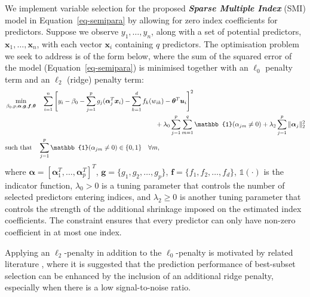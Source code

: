 \documentclass[
  11pt,
  a4paper,
]{article}
\begin{document}
We implement variable selection for the proposed \textbf{\emph{Sparse
Multiple Index}} (SMI) model in Equation~\ref{eq-semipara} by allowing
for zero index coefficients for predictors. Suppose we observe
\(y_1,\dots,y_n\), along with a set of potential predictors,
\(\bm{x}_1,\dots,\bm{x}_n\), with each vector \(\bm{x}_i\) containing
\(q\) predictors. The optimisation problem we seek to address is of the
form below, where the sum of the squared error of the model
(Equation~\ref{eq-semipara}) is minimised together with an \(\ell_{0}\)
penalty term and an \(\ell_{2}\) (ridge) penalty term: \begin{align}
  & \min_{\beta_{0}, p, \bm{\alpha}, \bm{g}, \bm{f}, \bm{\theta}} \quad \sum_{i = 1}^{n}\Bigg [ y_{i} - \beta_{0} - \sum_{j = 1}^{p}g_{j}(\bm{\alpha}_{j}^{T}\bm{x}_{i}) - \sum_{k = 1}^{d}f_{k}(w_{ik}) - \bm{\theta}^{T}\bm{u}_{i}\Bigg]^{2} \label{eq-smi}\\
  & \hspace*{8cm} + \lambda_{0}\sum_{j = 1}^{p}\sum_{m = 1}^{q}\mathbb{1}(\alpha_{jm} \neq 0) + \lambda_{2}\sum_{j = 1}^{p}\|\bm{\alpha}_{j}\|_2^2 \nonumber \\
  & \text{such that}\quad \sum_{j=1}^p \mathbb{1}(\alpha_{jm} \neq 0) \in \{0,1\} \quad \forall m ,\nonumber
\end{align} where
\(\bm{\alpha} = [\bm{\alpha}_{1}^{T}, \dots, \bm{\alpha}_{p}^{T} ]^{T}\),
\(\bm{g} = \{g_{1}, g_{2}, \dots, g_{p}\}\),
\(\bm{f} = \{f_{1}, f_{2}, \dots, f_{d}\}\), \(\mathbb{1}(\cdot)\) is
the indicator function, \(\lambda_{0} > 0\) is a tuning parameter that
controls the number of selected predictors entering indices, and
\(\lambda_{2} \ge 0\) is another tuning parameter that controls the
strength of the additional shrinkage imposed on the estimated index
coefficients. The constraint ensures that every predictor can only have
non-zero coefficient in at most one index.

Applying an \(\ell_{2}\)-penalty in addition to the \(\ell_{0}\)-penalty
is motivated by related literature
\autocites[e.g.,][]{Hazimeh2020,Mazumder2023,Hazimeh2023}, where it is
suggested that the prediction performance of best-subset selection can
be enhanced by the inclusion of an additional ridge penalty, especially
when there is a low signal-to-noise ratio.
\end{document}
